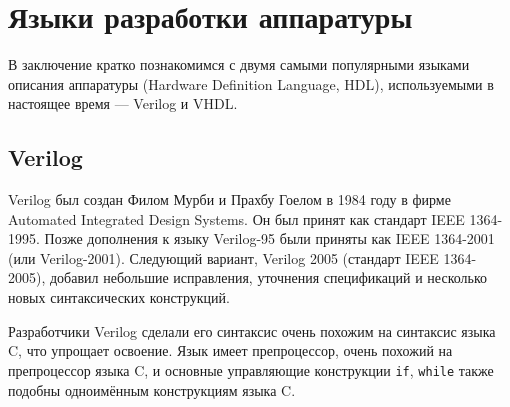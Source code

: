 




\section{Языки разработки аппаратуры}

В заключение кратко познакомимся с двумя самыми популярными языками описания аппаратуры (\abbr Hardware Definition Language, HDL), используемыми в настоящее время --- Verilog и VHDL.

\subsection{Verilog}
 
Verilog был создан Филом Мурби и Прахбу Гоелом в  1984 году в фирме Auto\-mated In\-te\-gra\-ted De\-sign Sys\-tems. Он был принят как стандарт IEEE 1364-1995. Позже дополнения к языку Verilog-95 были приняты как IEEE 1364-2001 (или Veri\-log-2001). Следующий вариант, Verilog 2005 (стандарт IEEE 1364-2005), добавил небольшие исправления, уточнения спецификаций и несколько новых синтаксических конструкций.

Разработчики Verilog сделали его синтаксис очень похожим на синтаксис языка C, что упрощает освоение. Язык имеет препроцессор, очень похожий на препроцессор языка C, и основные управляющие конструкции \texttt{if}, \texttt{while} также подобны одноимённым конструкциям языка C. 

